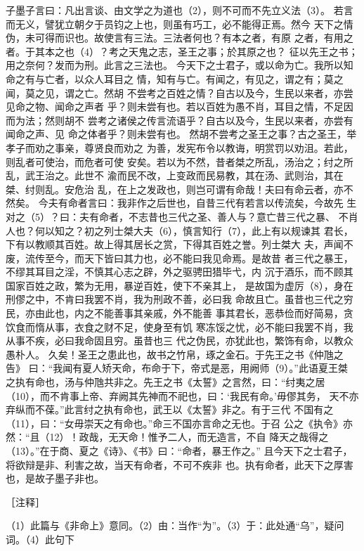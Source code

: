 \documentclass[12pt,UTF8]{ctexbook}
\begin{document}
子墨子言曰：凡出言谈、由文学之为道也（2），则不可而不先立义法（3）。 
若言而无义，譬犹立朝夕于员钧之上也，则虽有巧工，必不能得正焉。然今 
天下之情伪，未可得而识也。故使言有三法。三法者何也？有本之者，有原 
之者，有用之者。于其本之也（4）？考之天鬼之志，圣王之事；於其原之也？ 
征以先王之书；用之奈何？发而为刑。此言之三法也。 
今天下之士君子，或以命为亡。我所以知命之有与亡者，以众人耳目之 
情，知有与亡。有闻之，有见之，谓之有；莫之闻，莫之见，谓之亡。然胡 
不尝考之百姓之情？自古以及今，生民以来者，亦尝见命之物、闻命之声者 
乎？则未尝有也。若以百姓为愚不肖，耳目之情，不足因而为法；然则胡不 
尝考之诸侯之传言流语乎？自古以及今，生民以来者，亦尝有闻命之声、见 
命之体者乎？则未尝有也。 
然胡不尝考之圣王之事？古之圣王，举孝子而劝之事亲，尊贤良而劝之 
为善，发宪布令以教诲，明赏罚以劝沮。若此，则乱者可使治，而危者可使 
安矣。若以为不然，昔者桀之所乱，汤治之；纣之所乱，武王治之。此世不 
渝而民不改，上变政而民易教，其在汤、武则治，其在桀、纣则乱。安危治 
乱，在上之发政也，则岂可谓有命哉！夫曰有命云者，亦不然矣。 
今夫有命者言曰：我非作之后世也，自昔三代有若言以传流矣，今故先 
生对之（5）？曰：夫有命者，不志昔也三代之圣、善人与？意亡昔三代之暴、 
不肖人也？何以知之？初之列士桀大夫（6），慎言知行（7），此上有以规谏其 
君长，下有以教顺其百姓。故上得其居长之赏，下得其百姓之誉。列士桀大 
夫，声闻不废，流传至今，而天下皆曰其力也，必不能曰我见命焉。是故昔 
者三代之暴王，不缪其耳目之淫，不慎其心志之辟，外之驱骋田猎毕弋，内 
沉于酒乐，而不顾其国家百姓之政，繁为无用，暴逆百姓，使下不亲其上， 
是故国为虚厉（8），身在刑僇之中，不肯曰我罢不肖，我为刑政不善，必曰我 
命故且亡。虽昔也三代之穷民，亦由此也，内之不能善事其亲戚，外不能善 
事其君长，恶恭俭而好简易，贪饮食而惰从事，衣食之财不足，使身至有饥 
寒冻馁之忧，必不能曰我罢不肖，我从事不疾，必曰我命固且穷。虽昔也三 
代之伪民，亦犹此也，繁饰有命，以教众愚朴人。 
久矣！圣王之患此也，故书之竹帛，琢之金石。于先王之书《仲虺之告》 
曰：“我闻有夏人矫天命，布命于下，帝式是恶，用阙师（9）。”此语夏王桀 
之执有命也，汤与仲虺共非之。先王之书《太誓》之言然，曰：“纣夷之居 
（10），而不肯事上帝、弃阙其先神而不祀也，曰：‘我民有命。’毋僇其务， 
天不亦弃纵而不葆。”此言纣之执有命也，武王以《太誓》非之。有于三代 
不国有之（11），曰：“女毋崇天之有命也。”命三不国亦言命之无也。于召 
公之《执令》亦然：“且（12）！政哉，无天命！惟予二人，而无造言，不自 
降天之哉得之（13）。”在于商、夏之《诗》、《书》曰：“命者，暴王作之。” 
且今天下之士君子，将欲辩是非、利害之故，当天有命者，不可不疾非 
也。执有命者，此天下之厚害也，是故子墨子非也。 


［注释］ 

（1）此篇与《非命上》意同。（2）由：当作“为”。（3）于：此处通“乌”，疑问词。（4）此句下 
\end{document}
